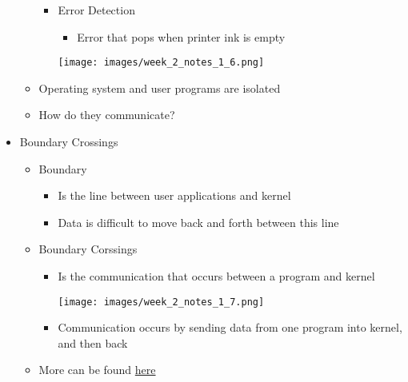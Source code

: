 \documentclass[12pt]{article}
\begin{document}
\begin{itemize}
\begin{itemize}
\begin{itemize}
            \item Error Detection
            \begin{itemize}
                \item Error that pops when printer ink is empty
            \end{itemize}

            \begin{center}
            \texttt{[image: images/week\_2\_notes\_1\_6.png]}
            \end{center}
        \end{itemize}

        \item Operating system and user programs are isolated

        \item How do they communicate?
    \end{itemize}
    \item Boundary Crossings

    \bigskip

    \begin{itemize}
        \item Boundary
        \begin{itemize}
            \item Is the line between user applications and kernel
            \item Data is difficult to move back and forth between this line
        \end{itemize}
        \item Boundary Corssings
        \begin{itemize}
            \item Is the communication that occurs between a program and kernel

            \begin{center}
            \texttt{[image: images/week\_2\_notes\_1\_7.png]}
            \end{center}

            \item Communication occurs by sending data from one program into kernel,
            and then back
        \end{itemize}
        \item More can be found \href{https://docs.huihoo.com/darwin/kernel-programming-guide/boundaries/chapter_14_section_1.html}{here}
    \end{itemize}


\end{itemize}
\end{document}
